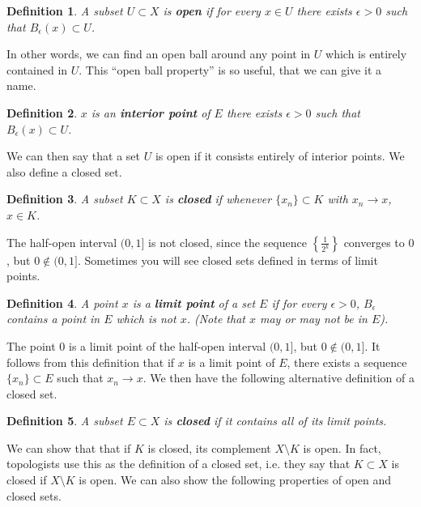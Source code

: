 \documentclass[12pt]{amsart}         %
\newtheorem{definition}{Definition}[section]
\theoremstyle{remark}
\begin{document}
\begin{definition}
A subset $U \subset X$ is \textbf{open} if for every $x \in U$ there exists $\epsilon > 0$ such that $B_\epsilon(x) \subset U$.
\end{definition}

In other words, we can find an open ball around any point in $U$ which is entirely contained in $U$. This ``open ball property'' is so useful, that we can give it a name.

\begin{definition}
$x$ is an \textbf{interior point} of $E$ there exists $\epsilon > 0$ such that $B_\epsilon(x) \subset U$.
\end{definition}

We can then say that a set $U$ is open if it consists entirely of interior points. We also define a closed set.

\begin{definition}
A subset $K \subset X$ is \textbf{closed} if whenever $\{x_n\} \subset K$ with $x_n \rightarrow x$, $x \in K$.
\end{definition}

The half-open interval $(0,1]$ is not closed, since the sequence $\left\{ \frac{1}{2^k} \right\}$ converges to $0$, but $0 \notin (0,1]$. Sometimes you will see closed sets defined in terms of limit points.

\begin{definition}
A point $x$ is a \textbf{limit point} of a set $E$ if for every $\epsilon > 0$, $B_\epsilon$ contains a point in $E$ which is not $x$. (Note that $x$ may or may not be in $E$).
\end{definition}

The point $0$ is a limit point of the half-open interval $(0,1]$, but $0 \notin (0,1]$. It follows from this definition that if $x$ is a limit point of $E$, there exists a sequence $\{x_n\} \subset E$ such that $x_n \rightarrow x$. We then have the following alternative definition of a closed set.

\begin{definition}
A subset $E \subset X$ is \textbf{closed} if it contains all of its limit points.
\end{definition}

We can show that that if $K$ is closed, its complement $X\setminus K$ is open. In fact, topologists use this as the definition of a closed set, i.e. they say that $K \subset X$ is closed if $X\setminus K$ is open. We can also show the following properties of open and closed sets.
\end{document}
